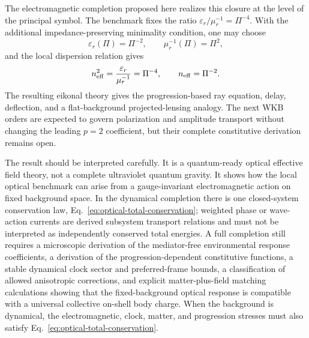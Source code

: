 \documentclass[12pt]{article}
\begin{document}
The electromagnetic completion proposed here realizes this closure at the level of the principal symbol.  The benchmark fixes the ratio \(\varepsilon_r/\mu_r^{-1}=\Pi^{-4}\).  With the additional impedance-preserving minimality condition, one may choose
\begin{equation}
 \varepsilon_r(\Pi)=\Pi^{-2},
 \qquad
 \mu_r^{-1}(\Pi)=\Pi^{2},
\end{equation}
and the local dispersion relation gives
\begin{equation}
 n_{\rm eff}^2=\frac{\varepsilon_r}{\mu_r^{-1}}=\Pi^{-4},
 \qquad
 n_{\rm eff}=\Pi^{-2}.
\end{equation}
The resulting eikonal theory gives the progression-based ray equation, delay, deflection, and a flat-background projected-lensing analogy.  The next WKB orders are expected to govern polarization and amplitude transport without changing the leading $p=2$ coefficient, but their complete constitutive derivation remains open.

The result should be interpreted carefully.  It is a quantum-ready optical effective field theory, not a complete ultraviolet quantum gravity.  It shows how the local optical benchmark can arise from a gauge-invariant electromagnetic action on fixed background space.  In the dynamical completion there is one closed-system conservation law, Eq.~\eqref{eq:optical-total-conservation}; weighted phase or wave-action currents are derived subsystem transport relations and must not be interpreted as independently conserved total energies.  A full completion still requires a microscopic derivation of the mediator-free environmental response coefficients, a derivation of the progression-dependent constitutive functions, a stable dynamical clock sector and preferred-frame bounds, a classification of allowed anisotropic corrections, and explicit matter-plus-field matching calculations showing that the fixed-background optical response is compatible with a universal collective on-shell body charge.  When the background is dynamical, the electromagnetic, clock, matter, and progression stresses must also satisfy Eq.~\eqref{eq:optical-total-conservation}.
\end{document}
